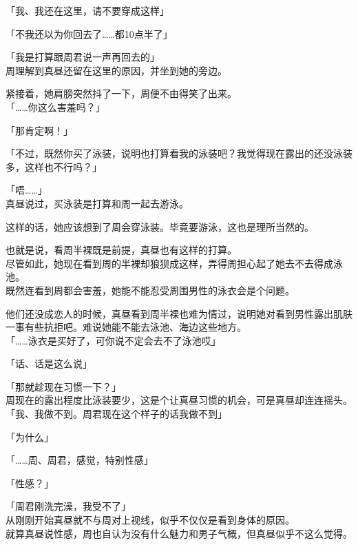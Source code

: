 「我、我还在这里，请不要穿成这样」

「不我还以为你回去了……都10点半了」

「我是打算跟周君说一声再回去的」\\

周理解到真昼还留在这里的原因，并坐到她的旁边。

紧接着，她肩膀突然抖了一下，周便不由得笑了出来。\\

「……你这么害羞吗？」

「那肯定啊！」

「不过，既然你买了泳装，说明也打算看我的泳装吧？我觉得现在露出的还没泳装多，这样也不行吗？」

「唔……」\\

真昼说过，买泳装是打算和周一起去游泳。

这样的话，她应该想到了周会穿泳装。毕竟要游泳，这也是理所当然的。

也就是说，看周半裸既是前提，真昼也有这样的打算。\\

尽管如此，她现在看到周的半裸却狼狈成这样，弄得周担心起了她去不去得成泳池。\\

既然连看到周都会害羞，她能不能忍受周围男性的泳衣会是个问题。

他们还没成恋人的时候，真昼看到周半裸也难为情过，说明她对看到男性露出肌肤一事有些抗拒吧。难说她能不能去泳池、海边这些地方。\\

「……泳衣是买好了，可你说不定会去不了泳池哎」

「话、话是这么说」

「那就趁现在习惯一下？」\\

周现在的露出程度比泳装要少，这是个让真昼习惯的机会，可是真昼却连连摇头。\\

「我、我做不到。周君现在这个样子的话我做不到」

「为什么」

「……周、周君，感觉，特别性感」

「性感？」

「周君刚洗完澡，我受不了」\\

从刚刚开始真昼就不与周对上视线，似乎不仅仅是看到身体的原因。\\

就算真昼说性感，周也自认为没有什么魅力和男子气概，但真昼似乎不这么觉得。

